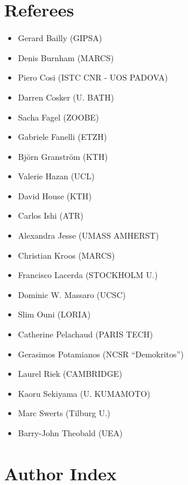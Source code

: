\section*{Referees}
\begin{itemize}
\item Gerard Bailly (GIPSA)
\item Denis Burnham (MARCS)
\item Piero Cosi (ISTC CNR - UOS PADOVA)
\item Darren Cosker (U. BATH)
\item Sacha Fagel (ZOOBE)
\item Gabriele Fanelli (ETZH)
\item Björn Granström (KTH)
\item Valerie Hazan (UCL)
\item David House (KTH)
\item Carlos Ishi (ATR)
\item Alexandra Jesse (UMASS AMHERST)
\item Christian Kroos (MARCS)
\item Francisco Lacerda (STOCKHOLM U.)
\item Dominic W. Massaro (UCSC)
\item Slim Ouni (LORIA)
\item Catherine Pelachaud (PARIS TECH)
\item Gerasimos Potamianos (NCSR ``Demokritos'')
\item Laurel Riek (CAMBRIDGE)
\item Kaoru Sekiyama (U. KUMAMOTO)
\item Marc Swerts (Tilburg U.)
\item Barry-John Theobald (UEA)
\end{itemize}
\newpage
\tableofcontents

\cleardoublepage

\cleardoublepage


\section*{Author Index}
\begin{multicols}{2}
\printauthorindex
\end{multicols}



